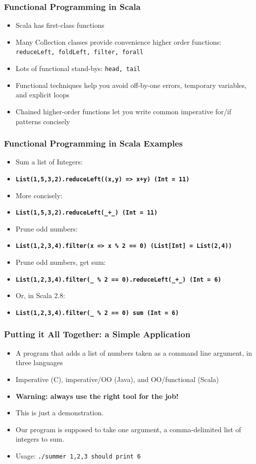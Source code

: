 \documentclass[hyperref={colorlinks=true}]{beamer}
\begin{document}
\begin{frame} 
\frametitle{Functional Programming in Scala}
\begin{itemize}
  \item<1-> Scala has first-class functions
  \item<2-> Many Collection classes provide convenience higher order functions: \tt\small{reduceLeft, foldLeft, filter, forall}
  \item<3-> Lots of functional stand-bys: \tt\small{head, tail}
  \item<4-> Functional techniques help you avoid off-by-one errors, temporary variables, and explicit loops
  \item<5-> Chained higher-order functions let you write common imperative for/if patterns concisely
\end{itemize}
\end{frame} 

\begin{frame} 
\frametitle{Functional Programming in Scala Examples}
\begin{itemize}
  \item<1-> Sum a list of Integers:
  \item<1-> \tt\small\textbf{List(1,5,3,2).reduceLeft((x,y) => x+y) (Int = 11)}
  \item<2-> More concisely:
  \item<2-> \tt\small\textbf{List(1,5,3,2).reduceLeft(\_+\_) (Int = 11)}
  \item<3-> Prune odd numbers:
  \item<3-> \tt\small\textbf{List(1,2,3,4).filter(x => x \% 2 == 0) (List[Int] = List(2,4))}
  \item<4-> Prune odd numbers, get sum:
  \item<4-> \tt\small\textbf{List(1,2,3,4).filter(\_ \% 2 == 0).reduceLeft(\_+\_) (Int = 6)}
  \item<5-> Or, in Scala 2.8:
  \item<5-> \tt\small\textbf{List(1,2,3,4).filter(\_ \% 2 == 0) sum (Int = 6)}
\end{itemize}
\end{frame} 

\begin{frame} 
\frametitle{Putting it All Together: a Simple Application}
\begin{itemize}
  \item<1-> A program that adds a list of numbers taken as a command line argument, in three languages 
  \item<2-> Imperative (C), imperative/OO (Java), and OO/functional (Scala)
  \item<3-> \textbf{Warning: always use the right tool for the job!}
  \item<3-> This is just a demonstration.
  \item<4-> Our program is supposed to take one argument, a comma-delimited list of integers to sum.
  \item<4-> Usage: \tt{./summer 1,2,3} should print 6
\end{itemize}
\end{frame} 
\end{document}
